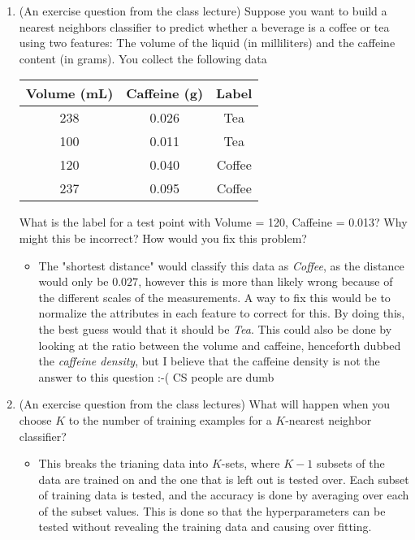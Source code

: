 \documentclass{article}
\begin{document}
\begin{enumerate}
\item (An exercise question from the class lecture) Suppose you want to build a nearest neighbors classifier to predict whether a beverage is a coffee or tea using two features: The volume of the liquid (in milliliters) and the caffeine content (in grams). You collect the following data
\begin{center}
\begin{tabular}{|c c | c|}
\hline
{\bf Volume (mL)} & {\bf Caffeine (g)} & {\bf Label}\\
\hline
238 & 0.026 & Tea\\
100 & 0.011 & Tea\\
120 & 0.040 & Coffee\\
237 & 0.095 & Coffee\\
\hline
\end{tabular}
\end{center}

What is the label for a test point with Volume = 120, Caffeine = 0.013? Why might this be incorrect? How would you fix this problem?


	\begin{itemize}
	\item The "shortest distance" would classify this data as {\em Coffee}, as the distance would only be $0.027$, however this is more than likely wrong because of the different scales of the measurements. A way to fix this would be to normalize the attributes in each feature to correct for this. By doing this, the best guess would that it should be {\em Tea}. This could also be done by looking at the ratio between the volume and caffeine, henceforth dubbed the {\em caffeine density}, but I believe that the caffeine density is not the answer to this question :-( {\scriptsize CS people are dumb}
	\end{itemize}




\item (An exercise question from the class lectures) What will happen when you choose $K$ to the number of training examples for a $K$-nearest neighbor classifier?


	\begin{itemize}
	\item This breaks the trianing data into $K$-sets, where $K-1$ subsets of the data are trained on and the one that is left out is tested over. Each subset of training data is tested, and the accuracy is done by averaging over each of the subset values. This is done so that the hyperparameters can be tested without revealing the training data and causing over fitting.
	\end{itemize}




\end{enumerate}
\end{document}
